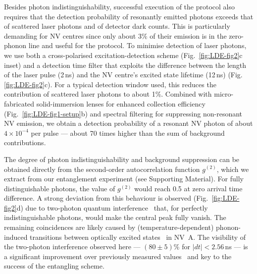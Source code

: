 Besides photon indistinguishability, successful execution of the protocol also requires that the detection probability of resonantly emitted photons exceeds that of scattered laser photons and of detector dark counts. This is particularly demanding for NV centres since only about 3\% of their emission is in the zero-phonon line and useful for the protocol. To minimise detection of laser photons, we use both a cross-polarised excitation-detection scheme (Fig.~\ref{fig:LDE-fig2}c inset) and a detection time filter that exploits the difference between the length of the laser pulse (2$\,$ns) and the NV centre's excited state lifetime (12\,ns) (Fig.\,\ref{fig:LDE-fig2}c). For a typical detection window used, this reduces the contribution of scattered laser photons to about 1\%. Combined with micro-fabricated solid-immersion lenses for enhanced collection efficiency (Fig.~\ref{fig:LDE-fig1-setup}b) and spectral filtering for suppressing non-resonant NV emission, we obtain a detection probability of a resonant NV photon of about $4\times10^{-4}$ per pulse --- about 70 times higher than the sum of background contributions.

The degree of photon indistinguishability and background suppression can be obtained directly from the second-order autocorrelation function $g^{(2)}$, which we extract from our entanglement experiment (see Supporting Material). For fully distinguishable photons, the value of $g^{(2)}$ would reach 0.5 at zero arrival time difference. A strong deviation from this behaviour is observed (Fig.~\ref{fig:LDE-fig2}d) due to two-photon quantum interference~\cite{Hong1987} that, for perfectly indistinguishable photons, would make the central peak fully vanish. The remaining coincidences are likely caused by (temperature-dependent) phonon-induced transitions between optically excited states~\cite{Fu2009} in NV~A. The visibility of the two-photon interference observed here --- $(80\pm5)$\% for $|dt| < 2.56\,$ns --- is a significant improvement over previously measured values~\cite{Bernien2012a,Sipahigil2012} and key to the success of the entangling scheme.

